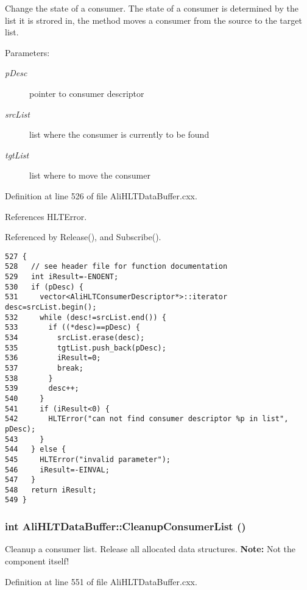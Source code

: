 Change the state of a consumer. The state of a consumer is determined by the list it is strored in, the method moves a consumer from the source to the target list. \begin{Desc}
\item[Parameters:]
\begin{description}
\item[{\em p\-Desc}]pointer to consumer descriptor \item[{\em src\-List}]list where the consumer is currently to be found \item[{\em tgt\-List}]list where to move the consumer \end{description}
\end{Desc}


Definition at line 526 of file Ali\-HLTData\-Buffer.cxx.

References HLTError.

Referenced by Release(), and Subscribe().

\footnotesize\begin{verbatim}527 {
528   // see header file for function documentation
529   int iResult=-ENOENT;
530   if (pDesc) {
531     vector<AliHLTConsumerDescriptor*>::iterator desc=srcList.begin();
532     while (desc!=srcList.end()) {
533       if ((*desc)==pDesc) {
534         srcList.erase(desc);
535         tgtList.push_back(pDesc);
536         iResult=0;
537         break;
538       }
539       desc++;
540     }
541     if (iResult<0) {
542       HLTError("can not find consumer descriptor %p in list", pDesc);
543     }
544   } else {
545     HLTError("invalid parameter");
546     iResult=-EINVAL;
547   }
548   return iResult;
549 }
\end{verbatim}\normalsize 


\subsubsection{\setlength{\rightskip}{0pt plus 5cm}int Ali\-HLTData\-Buffer::Cleanup\-Consumer\-List ()\hspace{0.3cm}{\tt  [private]}}\label{classAliHLTDataBuffer_d4}


Cleanup a consumer list. Release all allocated data structures. {\bf Note:} Not the component itself! 

Definition at line 551 of file Ali\-HLTData\-Buffer.cxx.

